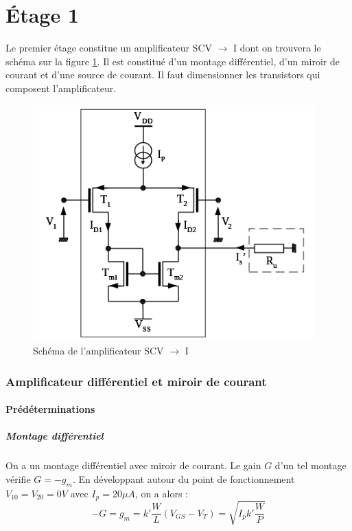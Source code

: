 \documentclass[french]{article}
\begin{document}
\newpage
\part{ Étage 1}
\label{part:etage1}
Le premier étage constitue un amplificateur SCV $\rightarrow$ I dont on trouvera le schéma sur la figure \ref{circuit}. Il est constitué d'un montage différentiel, d'un miroir de courant et d'une source de courant. Il faut dimensionner les transistors qui composent l'amplificateur.

\begin{figure}[h!]
	\centering
	\includegraphics[height=0.25\textheight]{images/circuit.png}
	\caption{Schéma de l'amplificateur SCV $\rightarrow$ I}
	\label{circuit}
\end{figure}

\section{ Amplificateur différentiel et miroir de courant}

\subsection{ Prédéterminations}

\subsubsection{ Montage différentiel}

On a un montage différentiel avec miroir de courant. Le gain $G$ d'un tel montage vérifie $G=-g_m$. En développant autour du point de fonctionnement $V_{10} = V_{20} = 0V$ avec $I_p = 20 \mu A$, on a alors :
\begin{equation}
-G = g_m = k' \frac{W}{L} (V_{GS} - V_T) = \sqrt{I_p k' \frac{W}{P}} \label{eq:GainT}
\end{equation}
\end{document}
